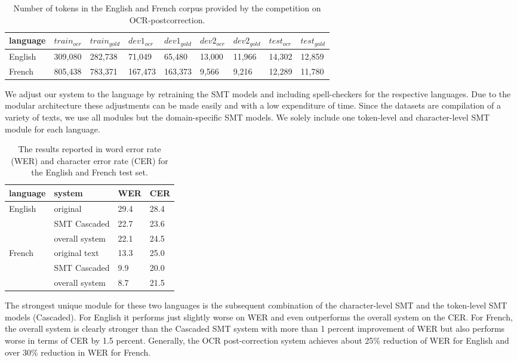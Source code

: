 \documentclass[11pt,letterpaper]{article}
\begin{document}
\begin{table*}[t!]
\begin{tabular}{lllllllll}
\toprule
language & $train_{ocr}$ & $train_{gold}$ &$dev1_{ocr}$ &$dev1_{gold}$ &$dev2_{ocr}$ &$dev2_{gold}$ &$test_{ocr}$ &$test_{gold}$ \\
\midrule
English & 309,080 & 282,738 & 71,049 & 65,480 & 13,000 & 11,966 & 14,302&12,859\\
\midrule
French &805,438 &783,371 & 167,473&163,373&9,566 &9,216 & 12,289 & 11,780\\
\bottomrule 
\end{tabular}
\caption{Number of tokens in the English and French corpus provided by the competition on OCR-postcorrection.}
\label{sharedtaskdata}
\end{table*}

We adjust our system to the language by retraining the SMT models and including spell-checkers for the respective languages. Due to the modular architecture these adjustments can be made easily and with a low expenditure of time. Since the datasets are compilation of a variety of texts, we use all modules but the domain-specific SMT models. We solely include one token-level and character-level SMT module for each language.

\begin{table}[h!]
\center
\small
\begin{tabular}{llll}
\toprule
language & system & WER & CER\\
\midrule
\multirow{ 3}{*}{ English} & original & 29.4&28.4\\
                            &SMT Cascaded&22.7&23.6\\
                            &overall system&22.1&24.5\\
                            \midrule
\multirow{ 3}{*}{French} & original text & 13.3 & 25.0\\
                         & SMT Cascaded & 9.9& 20.0\\
                         & overall system &8.7&21.5\\
\bottomrule
\end{tabular}
\caption{The results reported in word error rate (WER) and character error rate (CER) for the English and French test set.}
\label{resultssharedtask}
\end{table}

The strongest unique module for these two languages is the subsequent combination of the character-level SMT and the token-level SMT models (Cascaded). For English it performs just slightly worse on WER and even outperforms the overall system on the CER. For French, the overall system is clearly stronger than the Cascaded SMT system with more than 1 percent improvement of WER but also performs worse in terms of CER by 1.5 percent. 
Generally, the OCR post-correction system achieves about 25\% reduction of WER for English and over 30\% reduction in WER for French.
\end{document}
